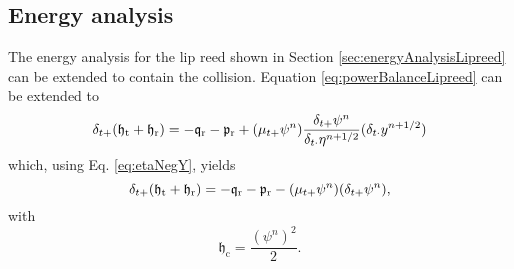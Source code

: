 \subsection{Energy analysis}
The energy analysis for the lip reed shown in Section \ref{sec:energyAnalysisLipreed} can be extended to contain the collision. Equation \eqref{eq:powerBalanceLipreed} can be extended to
\begin{equation*}
    \delta_{t+}(\mathfrak{h}_\text{t}+\mathfrak{h}_\text{r}) = - \mathfrak{q}_\text{r} - \mathfrak{p}_\text{r}+(\mu_{t+}\psi^n) \frac{\delta_{t+}\psi^n}{\delta_{t\cdot}\eta^{n+1/2}}(\delta_{t\cdot}y^{n+1/2})
\end{equation*}
which, using Eq. \eqref{eq:etaNegY}, yields
\begin{equation*}
    \delta_{t+}(\mathfrak{h}_\text{t}+\mathfrak{h}_\text{r}) = - \mathfrak{q}_\text{r} - \mathfrak{p}_\text{r}-(\mu_{t+}\psi^n) (\delta_{t+}\psi^n),
\end{equation*}
with
\begin{equation*}
    \mathfrak{h}_\text{c} = \frac{(\psi^n)^2}{2}.
\end{equation*}



